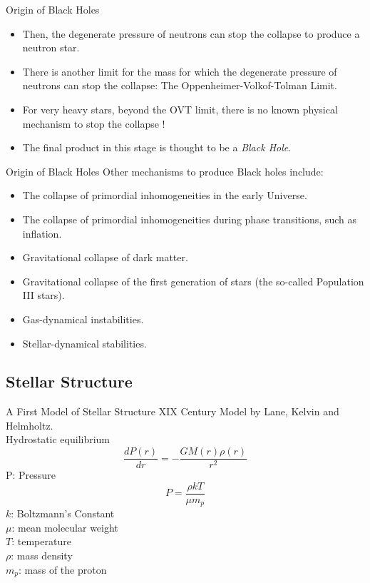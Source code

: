 \documentclass{beamer}
\begin{document}
\begin{frame}{Origin of Black Holes}
	\begin{itemize}
	\item<1-> Then, the degenerate pressure of neutrons can stop the collapse to produce a neutron star.
    \item<2-> There is another limit for the mass for which the degenerate pressure of neutrons can stop the collapse: The Oppenheimer-Volkof-Tolman Limit.
    \item<3-> For very heavy stars, beyond the OVT limit, there is no known physical mechanism to stop the collapse ! 
    \item<4-> The final product in this stage is thought to be a \textit{Black Hole}.
    \end{itemize}
\end{frame}

\begin{frame}{Origin of Black Holes}
	Other mechanisms to produce Black holes include:
	\begin{itemize}
	\item<2-> The collapse of primordial inhomogeneities in the early Universe. 
    \item<3-> The collapse of primordial inhomogeneities during phase transitions, such as inflation.
    \item<4-> Gravitational collapse of dark matter. 
    \item<5-> Gravitational collapse of the first generation of stars (the so-called Population III stars).
    \item<6->Gas-dynamical instabilities.
    \item<7-> Stellar-dynamical stabilities.
    \end{itemize}
\end{frame}

\subsection{Stellar Structure}
\begin{frame}{A First Model of Stellar Structure}
	\onslide<1-> XIX Century Model by Lane, Kelvin and Helmholtz.\\
     Hydrostatic equilibrium\\
    $$\frac{dP(r)}{dr} = -\frac{GM(r)\rho(r)}{r^2}$$
     P: Pressure
    $$P = \frac{\rho k T}{\mu m_p}$$
    $k$: Boltzmann's Constant\\
    $\mu$: mean molecular weight\\
    $T$: temperature\\
    $\rho$: mass density\\
    $m_p$: mass of the proton
\end{frame}
\end{document}
